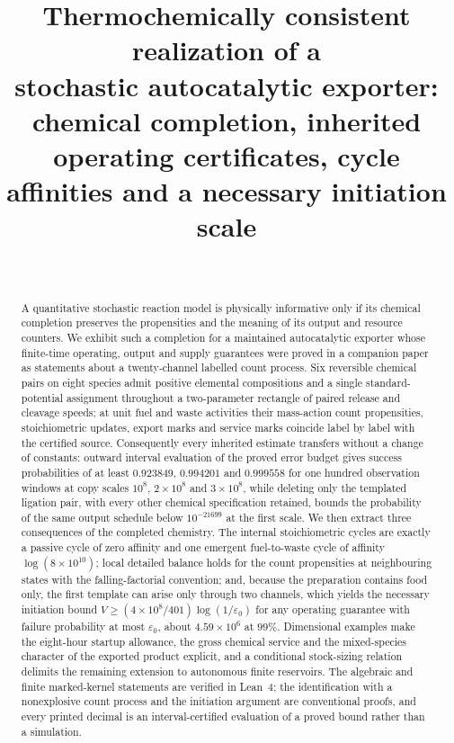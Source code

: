 \documentclass[11pt,a4paper]{article}
\title{Thermochemically consistent realization of a\\ stochastic autocatalytic exporter:\\[4pt]
\large chemical completion, inherited operating certificates, cycle affinities and a necessary initiation scale}
\author{\PaperAuthor\\ \small \PaperAffiliation}
\date{\PaperDate}
\theoremstyle{plain}
\theoremstyle{definition}
\theoremstyle{remark}
\newcommand{\eps}{\varepsilon}
\begin{document}
\maketitle

\begin{abstract}
A quantitative stochastic reaction model is physically informative only if its chemical completion preserves the propensities and the meaning of its output and resource counters. We exhibit such a completion for a maintained autocatalytic exporter whose finite-time operating, output and supply guarantees were proved in a companion paper as statements about a twenty-channel labelled count process. Six reversible chemical pairs on eight species admit positive elemental compositions and a single standard-potential assignment throughout a two-parameter rectangle of paired release and cleavage speeds; at unit fuel and waste activities their mass-action count propensities, stoichiometric updates, export marks and service marks coincide label by label with the certified source. Consequently every inherited estimate transfers without a change of constants: outward interval evaluation of the proved error budget gives success probabilities of at least $0.923849$, $0.994201$ and $0.999558$ for one hundred observation windows at copy scales $10^8$, $2\times10^8$ and $3\times10^8$, while deleting only the templated ligation pair, with every other chemical specification retained, bounds the probability of the same output schedule below $10^{-21699}$ at the first scale. We then extract three consequences of the completed chemistry. The internal stoichiometric cycles are exactly a passive cycle of zero affinity and one emergent fuel-to-waste cycle of affinity $\log(8\times10^{10})$; local detailed balance holds for the count propensities at neighbouring states with the falling-factorial convention; and, because the preparation contains food only, the first template can arise only through two channels, which yields the necessary initiation bound $V\ge(4\times10^8/401)\log(1/\eps_0)$ for any operating guarantee with failure probability at most $\eps_0$, about $4.59\times10^6$ at $99\%$. Dimensional examples make the eight-hour startup allowance, the gross chemical service and the mixed-species character of the exported product explicit, and a conditional stock-sizing relation delimits the remaining extension to autonomous finite reservoirs. The algebraic and finite marked-kernel statements are verified in Lean~4; the identification with a nonexplosive count process and the initiation argument are conventional proofs, and every printed decimal is an interval-certified evaluation of a proved bound rather than a simulation.
\end{abstract}
\end{document}

